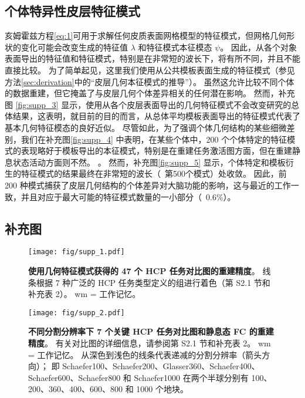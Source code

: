 \documentclass[lang=cn,a4paper,newtx]{elegantpaper}
\begin{document}
\subsection{个体特异性皮层特征模式} \label{sec:individual_specific}
亥姆霍兹方程\ref{eq:1}可用于求解任何皮质表面网格模型的特征模式，但网格几何形状的变化可能会改变生成的特征值 $ \lambda $ 和特征模式本征模态 $ \psi $。
因此，从各个对象表面导出的特征值和特征模式，特别是在非常短的波长下，将有所不同，并且不能直接比较\cite{henderson2022empirical,chen2022individuality}。
为了简单起见，这里我们使用从公共模板表面生成的特征模式（参见方法\ref{sec:derivation}中的“皮层几何本征模式的推导”）。
虽然这允许比较不同个体的数据重建，但它掩盖了与皮层几何个体差异相关的任何潜在影响。
然而，补充图 \ref{fig:supp_3} 显示，使用从各个皮层表面导出的几何特征模式不会改变研究的总体结果，这表明，就目前的目的而言，从总体平均模板表面导出的特征模式代表了基本几何特征模态的良好近似。
尽管如此，为了强调个体几何结构的某些细微差别，我们在补充图\ref{fig:supp_4} 中表明，在某些个体中，200 个个体特定的特征模式的表现略好于模板导出的本征模式，特别是在重建任务激活图方面，但在重建静息状态活动方面则不然。 。 
然而，补充图\ref{fig:supp_5} 显示，个体特定和模板衍生的特征模式的结果最终在非常短的波长（~第500个模式）处收敛。
因此，前 200 种模式捕获了皮层几何结构的个体差异对大脑功能的影响，这与最近的工作\cite{chen2022individuality}一致，并且对应于最大可能的特征模式数量的一小部分（~0.6\%）。


\subsection{补充图}

\begin{figure}[!htb] 
	\centering
	\texttt{[image: fig/supp\_1.pdf]}
	\caption{\textbf{使用几何特征模式获得的 47 个 HCP 任务对比图的重建精度}。
		线条根据 7 种广泛的 HCP 任务类型定义的组进行着色（第 S2.1 节和补充表 2）。 wm = 工作记忆。} \label{fig:supp_1}
\end{figure}



\begin{figure}[!htb] 
	\centering
	\texttt{[image: fig/supp\_2.pdf]}
	\caption{\textbf{不同分割分辨率下 7 个关键 HCP 任务对比图和静息态 FC 的重建精度}。 
		有关对比图的详细信息，请参阅第 S2.1 节和补充表 2。
		wm = 工作记忆。
		从深色到浅色的线条代表递减的分割分辨率（箭头方向）；
		即 Schaefer100、Schaefer200、Glasser360、Schaefer400、Schaefer600、Schaefer800 和 Schaefer1000 在两个半球分别有 100、200、360、400、600、800 和 1000 个地块。} \label{fig:supp_2}
\end{figure}
\end{document}
